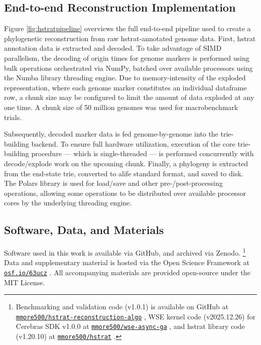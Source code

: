 \subsection{End-to-end Reconstruction Implementation}
\label{sec:pipeline}



Figure \ref{fig:hstratpipeline} overviews the full end-to-end pipeline used to create a phylogenetic reconstruction from raw hstrat-annotated genome data.
First, hstrat annotation data is extracted and decoded.
To take advantage of SIMD parallelism, the decoding of origin times for genome markers is performed using bulk operations orchestrated via NumPy, batched over available processors using the Numba library threading engine.
Due to memory-intensity of the exploded representation, where each genome marker constitutes an individual dataframe row, a chunk size may be configured to limit the amount of data exploded at any one time.
A chunk size of 50 million genomes was used for macrobenchmark trials.

Subsequently, decoded marker data is fed genome-by-genome into the trie-building backend.
To ensure full hardware utilization, execution of the core trie-building procedure --- which is single-threaded --- is performed concurrently with decode/explode work on the upcoming chunk.
Finally, a phylogeny is extracted from the end-state trie, converted to alife standard format, and saved to disk.
The Polars library is used for load/save and other pre-/post-processing operations, allowing some operations to be distributed over available processor cores by the underlying threading engine.

\subsection{Software, Data, and Materials} \label{sec:materials}

Software used in this work is available via GitHub, and archived via Zenodo.%
\footnote{\scriptsize Benchmarking and validation code (v1.0.1) is available on GitHub at \href{https://github.com/mmore500/hstrat-reconstruction-algo/tree/v1.0.1}{\texttt{mmore500/hstrat-reconstruction-algo}} \citep{matthew_andres_moreno_2025_16898918}, WSE kernel code (v2025.12.26) for Cerebras SDK v1.0.0 at \href{https://github.com/mmore500/wse-async-ga/tree/v2025.12.26}{\texttt{mmore500/wse-async-ga}} \citep{moreno_2025_16898904}, and hstrat library code (v1.20.10) at \href{https://github.com/mmore500/hstrat/tree/v1.20.10}{\texttt{mmore500/hstrat}} \citep{moreno_2025_16898849}.}
Data and supplementary material is hosted via the Open Science Framework at \href{https://osf.io/63ucz}{\texttt{osf.io/63ucz}} \citep{supplemental,foster2017open}.
All accompanying materials are provided open-source under the MIT License.

